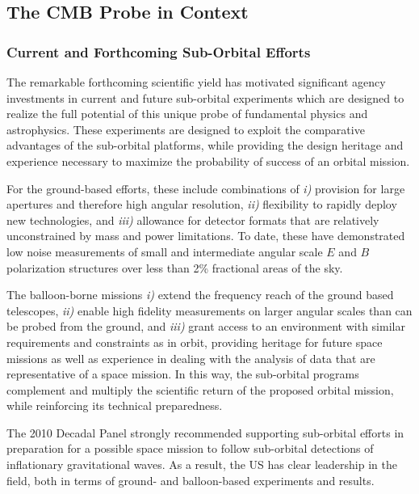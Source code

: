 
\subsection{The CMB Probe in Context}
\label{sec:spacemission}

\vspace{-0.05in}

\subsubsection{Current and Forthcoming Sub-Orbital Efforts}

The remarkable forthcoming scientific yield has motivated significant agency investments 
in current and future sub-orbital experiments which are designed to realize the full potential of this
unique probe of fundamental physics and astrophysics.    These experiments are designed 
to exploit the comparative advantages of the sub-orbital platforms, while providing the design heritage and 
experience necessary to maximize the probability of success of an orbital mission. 

For the ground-based efforts, these include combinations of {\it i)}
provision for large apertures and therefore high angular
resolution, {\it ii)} flexibility to rapidly deploy new technologies, and {\it iii)}
allowance for detector formats that are relatively unconstrained by
mass and power limitations.  To date, these have demonstrated low
noise measurements of small and intermediate angular scale $E$ and $B$ polarization 
structures over less than 2\% fractional areas of the sky. 


The balloon-borne missions {\it i)} extend the frequency reach of the ground based telescopes, 
{\it ii)} enable high fidelity measurements on larger angular scales than can be probed from the 
ground, and {\it iii)} grant access to an environment with similar requirements and constraints
as in orbit, providing heritage for future space missions as well as experience in dealing with the 
analysis of data that are representative of a space mission. In this way, the sub-orbital programs 
complement and multiply the scientific return of the proposed orbital mission, while reinforcing its 
technical preparedness.  

The 2010 Decadal Panel strongly recommended supporting sub-orbital efforts in preparation 
for a possible space mission to follow sub-orbital detections of inflationary gravitational waves. 
As a result, the US has clear leadership in the field, both in terms of ground- and balloon-based 
experiments and results. 

